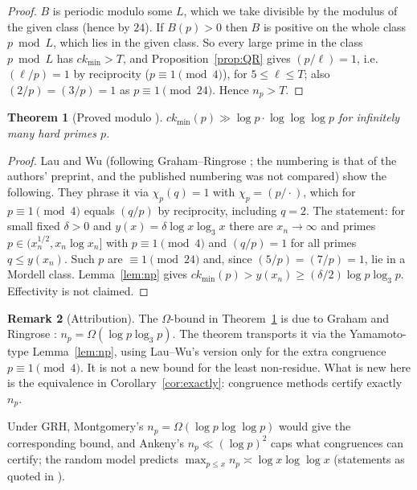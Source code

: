 \documentclass[11pt,reqno]{amsart}
\newtheorem{theorem}{Theorem}[section]
\theoremstyle{definition}
\newtheorem{remark}[theorem]{Remark}
\newcommand{\ckmin}{ck_{\min}}
\begin{document}
\begin{proof}
$B$ is periodic modulo some $L$, which we take divisible by the modulus of the given class (hence by $24$).  If $B(p)>0$ then $B$ is positive on the
whole class $p\bmod L$, which lies in the given class.  So every large prime in
the class $p\bmod L$ has $\ckmin>T$, and Proposition~\ref{prop:QR} gives
$(p/\ell)=1$, i.e.\ $(\ell/p)=1$ by reciprocity ($p\equiv1\pmod4$), for
$5\le\ell\le T$; also $(2/p)=(3/p)=1$ as $p\equiv1\pmod{24}$.  Hence $n_p>T$.
\end{proof}

\begin{theorem}[Proved modulo {\cite[Prop.~5.1]{LW}}]\label{thm:slice}
$\ckmin(p)\gg\log p\cdot\log\log\log p$ for infinitely many hard primes $p$.
\end{theorem}

\begin{proof}
Lau and Wu \cite[Prop.~5.1]{LW} (following Graham--Ringrose \cite{GR}; the
numbering is that of the authors' preprint, and the published numbering was not
compared) show the following.  They phrase it via $\chi_p(q)=1$ with
$\chi_p=(p/\cdot)$, which for $p\equiv1\pmod4$ equals $(q/p)$ by reciprocity,
including $q=2$.  The statement:
for small fixed $\delta>0$ and $y(x)=\delta\log x\log_3x$ there are
$x_n\to\infty$ and primes $p\in(x_n^{1/2},x_n\log x_n]$ with $p\equiv1\pmod4$
and $(q/p)=1$ for all primes $q\le y(x_n)$.  Such $p$ are $\equiv1\pmod{24}$
and, since $(5/p)=(7/p)=1$, lie in a Mordell class.  Lemma~\ref{lem:np} gives
$\ckmin(p)>y(x_n)\ge(\delta/2)\log p\log_3p$.  Effectivity is not claimed.
\end{proof}

\begin{remark}[Attribution]
The $\Omega$-bound in Theorem~\ref{thm:slice} is due to Graham and Ringrose
\cite{GR}: $n_p=\Omega(\log p\log_3p)$.  The theorem transports it via the
Yamamoto-type Lemma~\ref{lem:np}, using Lau--Wu's version only for the extra
congruence $p\equiv1\pmod4$.  It is not a new bound for the least non-residue.
What is new here is the equivalence in Corollary~\ref{cor:exactly}: congruence
methods certify exactly $n_p$.
\end{remark}

Under GRH, Montgomery's $n_p=\Omega(\log p\log\log p)$ would give the
corresponding bound, and Ankeny's $n_p\ll(\log p)^2$ caps what congruences can
certify; the random model predicts $\max_{p\le x}n_p\asymp\log x\log\log x$
(statements as quoted in \cite{LW}).
\end{document}
